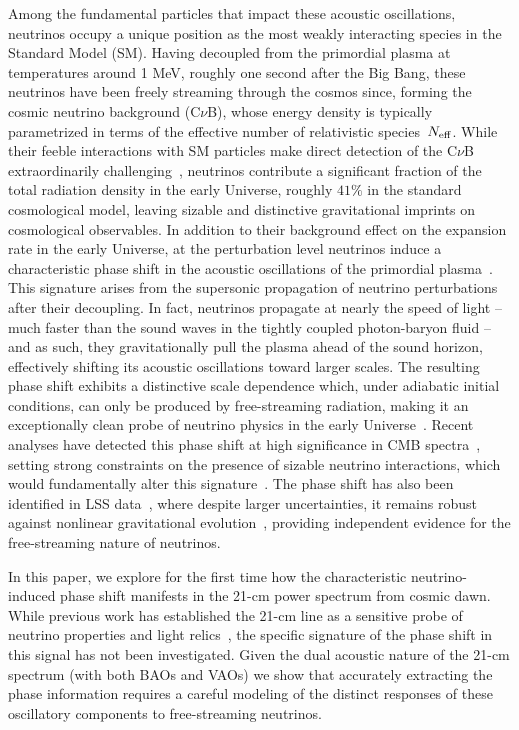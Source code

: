 Among the fundamental particles that impact these acoustic oscillations, neutrinos occupy a unique position as the most weakly interacting species in the Standard Model (SM).  Having decoupled from the primordial plasma at temperatures around 1 MeV, roughly one second after the Big Bang, these neutrinos have been freely streaming through the cosmos since, forming the cosmic neutrino background (C$\nu$B), whose energy density is typically parametrized in terms of the effective number of relativistic species~$N_{\rm eff}$. While their feeble interactions with SM particles make direct detection of the C$\nu$B extraordinarily challenging~\cite{Bauer:2022lri,PTOLEMY:2019hkd}, neutrinos contribute a significant fraction of the total radiation density in the early Universe, roughly $41\%$ in the standard cosmological model,  leaving sizable and distinctive gravitational imprints on cosmological observables. In addition to their background effect on the expansion rate in the early Universe, at the perturbation level neutrinos induce a characteristic phase shift in the acoustic oscillations of the primordial plasma~\citep{Bashinsky:2003tk}. This signature arises from the supersonic propagation of neutrino perturbations after their decoupling. In fact, neutrinos propagate  at nearly the speed of light -- much faster than the sound waves in the tightly coupled photon-baryon fluid -- and as such, they gravitationally pull the plasma ahead of the sound horizon, effectively shifting its acoustic oscillations toward larger scales. The resulting phase shift exhibits a distinctive scale dependence which, under adiabatic initial conditions, can only be produced by free-streaming radiation, making it an exceptionally clean probe of neutrino physics in the early Universe~\citep{Baumann:2015rya}. Recent analyses have detected this phase shift at high significance in CMB spectra~\citep{Follin:2015hya,Baumann:2015rya,Montefalcone:2025unv,montefalcone25}, setting strong constraints on the presence of sizable neutrino interactions, which would fundamentally alter this signature~\citep{Choi:2018gho,montefalcone25}. The phase shift has also been identified in LSS data~\citep{Baumann:2017gkg,Baumann:2019keh}, where despite larger uncertainties, it remains robust against nonlinear gravitational evolution~\citep{Baumann:2017lmt}, providing independent evidence for the free-streaming nature of neutrinos.


In this paper, we explore for the first time how the characteristic neutrino-induced phase shift manifests in the 21-cm power spectrum from cosmic dawn. While previous work has established the 21-cm line as a sensitive probe of neutrino properties and light relics~\citep{Lee:2023uxu,Dey:2022ini,Plombat:2024kla,Dhuria:2024zwh,Libanore:2025ack}, the specific signature of the phase shift in this signal has not been investigated. Given the dual acoustic nature of the 21-cm spectrum (with both BAOs and VAOs) we show that accurately extracting the phase information requires a careful modeling of the distinct responses of these oscillatory components to free-streaming neutrinos.

